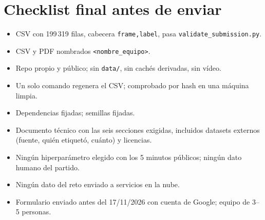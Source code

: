 \documentclass[11pt,a4paper]{article}
\newcommand{\todo}{$\square$}
\begin{document}
\section{Checklist final antes de enviar}

\begin{itemize}[label=\todo]
  \item CSV con 199\,319 filas, cabecera \texttt{frame,label}, pasa \texttt{validate\_submission.py}.
  \item CSV y PDF nombrados \texttt{<nombre\_equipo>}.
  \item Repo propio y p\'ublico; sin \texttt{data/}, sin cach\'es derivadas, sin v\'ideo.
  \item Un solo comando regenera el CSV; comprobado por hash en una m\'aquina limpia.
  \item Dependencias fijadas; semillas fijadas.
  \item Documento t\'ecnico con las seis secciones exigidas, incluidos datasets externos (fuente,
        qui\'en etiquet\'o, cu\'anto) y licencias.
  \item Ning\'un hiperpar\'ametro elegido con los 5 minutos p\'ublicos; ning\'un dato humano del partido.
  \item Ning\'un dato del reto enviado a servicios en la nube.
  \item Formulario enviado antes del 17/11/2026 con cuenta de Google; equipo de 3--5 personas.
\end{itemize}
\end{document}
